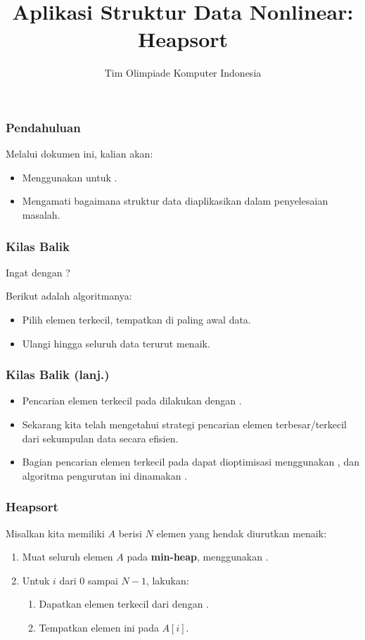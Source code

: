 

\title{Aplikasi Struktur Data Nonlinear: \newline Heapsort}
\author{Tim Olimpiade Komputer Indonesia}
\date{}



\begin{frame}
\titlepage
\end{frame}

\begin{frame}
\frametitle{Pendahuluan}
Melalui dokumen ini, kalian akan:
\begin{itemize}
  \item Menggunakan \pheap untuk \pheapsort.
  \item Mengamati bagaimana struktur data diaplikasikan dalam penyelesaian masalah.
\end{itemize}
\end{frame}

\begin{frame}
\frametitle{Kilas Balik}
Ingat dengan ?\newline

Berikut adalah algoritmanya:
\begin{itemize}
  \item Pilih elemen terkecil, tempatkan di paling awal data.
  \item Ulangi hingga seluruh data terurut menaik.
\end{itemize}
\end{frame}

\begin{frame}
\frametitle{Kilas Balik (lanj.)}
\begin{itemize}
  \item Pencarian elemen terkecil pada  dilakukan dengan .
  \item Sekarang kita telah mengetahui strategi pencarian elemen terbesar/terkecil dari sekumpulan data secara efisien.
  \item Bagian pencarian elemen terkecil pada  dapat dioptimisasi menggunakan \pheap, dan algoritma pengurutan ini dinamakan \newTerm{\pheapsort}.
\end{itemize}
\end{frame}

\begin{frame}
\frametitle{Heapsort}
Misalkan kita memiliki \farray $A$ berisi $N$ elemen yang hendak diurutkan menaik:
\begin{enumerate}
  \item Muat seluruh elemen \farray $A$ pada \textbf{min-heap}, menggunakan .
  \item Untuk $i$ dari $0$ sampai $N-1$, lakukan:
  \begin{enumerate}
    \item Dapatkan elemen terkecil dari \pheap dengan .
    \item Tempatkan elemen ini pada $A[i]$.
  \end{enumerate}
\end{enumerate}
\end{frame}

